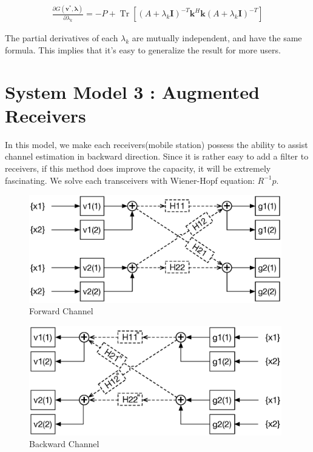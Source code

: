 \documentclass[11pt, oneside]{article}   	%
\DeclareMathOperator{\Tr}{Tr}
\begin{document}
\begin{align*}
\frac{\partial G( \textbf{v}^{*}, \pmb{\lambda} )}{\partial \lambda_{k}} = 
-P+
\Tr[
(A+\lambda_k\textbf{I})^{-T}\textbf{k}^{H}\textbf{k}(A+\lambda_k\textbf{I})^{-T}
]
\end{align*}

The partial derivatives of each $\lambda_{k}$ are mutually independent, and have the same formula. This implies that it's easy to generalize the result for more users.


\newpage

\section{System Model 3 : Augmented Receivers}
In this model, we make each receivers(mobile station) possess the ability to assist channel estimation in backward direction. Since it is rather easy to add a filter to receivers, if this method does improve the capacity, it will be extremely fascinating. We solve each transceivers with Wiener-Hopf equation: $R^{-1}p$.

 \begin{figure}[h]
    \centering
    \centerline{\includegraphics[width=110mm]{forward_channel_3}}
    \caption{Forward Channel}
\end{figure} 

\begin{figure}[h]
    \centering
    \centerline{\includegraphics[width=110mm]{backward_channel_3}}
    \caption{Backward Channel}
\end{figure} 
\end{document}

